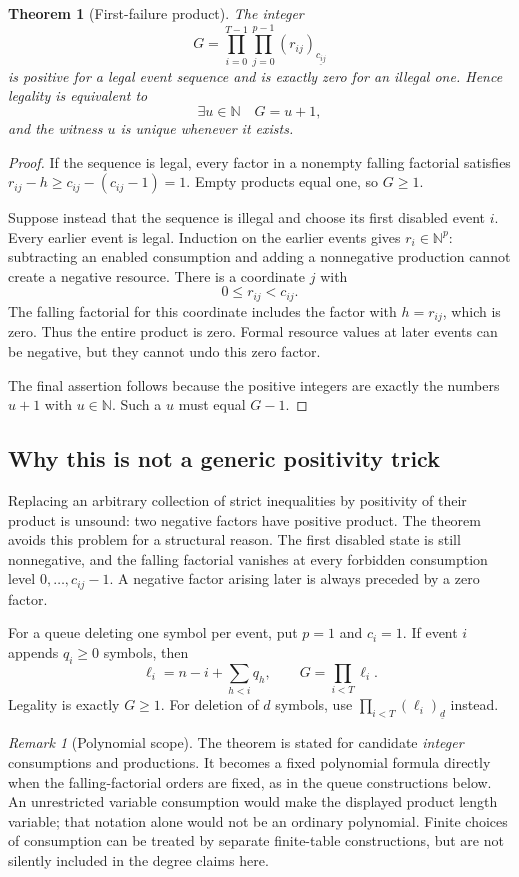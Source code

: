 \documentclass[11pt,a4paper]{article}
\newtheorem{theorem}{Theorem}[section]
\theoremstyle{definition}
\theoremstyle{remark}
\newtheorem{remark}[remark]{Remark}
\newcommand{\N}{\mathbb N}
\newcommand{\ff}[2]{(#1)_{\underline{#2}}}
\begin{document}
\begin{theorem}[First-failure product]\label{cdc:qc:thm:first-failure}
The integer
\[
 G=\prod_{i=0}^{T-1}\prod_{j=0}^{p-1}\ff{r_{ij}}{c_{ij}}
\]
is positive for a legal event sequence and is exactly zero for an illegal one. Hence legality is equivalent to
\[
 \exists u\in\N\quad G=u+1,
\]
and the witness $u$ is unique whenever it exists.
\end{theorem}
\begin{proof}
If the sequence is legal, every factor in a nonempty falling factorial satisfies $r_{ij}-h\geq c_{ij}-(c_{ij}-1)=1$. Empty products equal one, so $G\geq1$.

Suppose instead that the sequence is illegal and choose its first disabled event $i$. Every earlier event is legal. Induction on the earlier events gives $r_i\in\N^p$: subtracting an enabled consumption and adding a nonnegative production cannot create a negative resource. There is a coordinate $j$ with
\[
 0\leq r_{ij}<c_{ij}.
\]
The falling factorial for this coordinate includes the factor with $h=r_{ij}$, which is zero. Thus the entire product is zero. Formal resource values at later events can be negative, but they cannot undo this zero factor.

The final assertion follows because the positive integers are exactly the numbers $u+1$ with $u\in\N$. Such a $u$ must equal $G-1$.
\end{proof}

\subsection{Why this is not a generic positivity trick}
Replacing an arbitrary collection of strict inequalities by positivity of their product is unsound: two negative factors have positive product. The theorem avoids this problem for a structural reason. The first disabled state is still nonnegative, and the falling factorial vanishes at every forbidden consumption level $0,\ldots,c_{ij}-1$. A negative factor arising later is always preceded by a zero factor.

For a queue deleting one symbol per event, put $p=1$ and $c_i=1$. If event $i$ appends $q_i\geq0$ symbols, then
\[
 \ell_i=n-i+\sum_{h<i}q_h,
 \qquad G=\prod_{i<T}\ell_i.
\]
Legality is exactly $G\geq1$. For deletion of $d$ symbols, use $\prod_{i<T}\ff{\ell_i}{d}$ instead.

\begin{remark}[Polynomial scope]
The theorem is stated for candidate \emph{integer} consumptions and productions. It becomes a fixed polynomial formula directly when the falling-factorial orders are fixed, as in the queue constructions below. An unrestricted variable consumption would make the displayed product length variable; that notation alone would not be an ordinary polynomial. Finite choices of consumption can be treated by separate finite-table constructions, but are not silently included in the degree claims here.
\end{remark}
\end{document}
